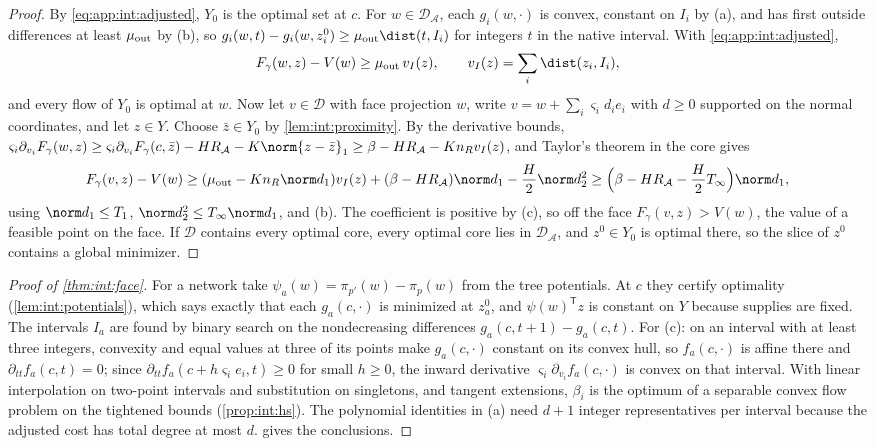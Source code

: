\begin{proof}
By \eqref{eq:app:int:adjusted}, $Y_0$ is the optimal set at $c$. For
$w\in\mathcal D_{\mathcal A}$, each $g_i(w,\cdot)$ is convex, constant on $I_i$ by (a),
and has first outside differences at least $\mu_{\rm out}$ by (b), so
$g_i(w,t)-g_i(w,z^0_i)\ge\mu_{\rm out}\dist(t,I_i)$ for integers $t$ in the native
interval. With \eqref{eq:app:int:adjusted},
\begin{equation}\label{eq:app:int:outside}
 F_\gamma(w,z)-V(w)\ge\mu_{\rm out}\,v_I(z),\qquad
 v_I(z)=\sum_i\dist(z_i,I_i),
\end{equation}
and every flow of $Y_0$ is optimal at $w$. Now let $v\in\mathcal D$ with face
projection $w$, write $v=w+\sum_i\varsigma_id_ie_i$ with $d\ge0$ supported on the normal
coordinates, and let $z\in Y$. Choose $\bar z\in Y_0$ by \cref{lem:int:proximity}. By the
derivative bounds,
$\varsigma_i\partial_{v_i}F_\gamma(w,z)\ge\varsigma_i\partial_{v_i}F_\gamma(c,\bar z)
-HR_{\mathcal A}-K\norm{z-\bar z}_1\ge\beta-HR_{\mathcal A}-Kn_Rv_I(z)$, and Taylor's
theorem in the core gives
\[
 F_\gamma(v,z)-V(w)\ge(\mu_{\rm out}-Kn_R\norm d_1)v_I(z)
 +(\beta-HR_{\mathcal A})\norm d_1-\frac H2\norm d_2^2
 \ge\Bigl(\beta-HR_{\mathcal A}-\frac H2T_\infty\Bigr)\norm d_1,
\]
using $\norm d_1\le T_1$, $\norm d_2^2\le T_\infty\norm d_1$, and (b). The coefficient
is positive by (c), so off the face $F_\gamma(v,z)>V(w)$, the value of a feasible
point on the face. If $\mathcal D$ contains every optimal core, every optimal core
lies in $\mathcal D_{\mathcal A}$, and $z^0\in Y_0$ is optimal there, so the slice of
$z^0$ contains a global minimizer.
\end{proof}

\begin{proof}[Proof of \cref{thm:int:face}]
For a network take $\psi_a(w)=\pi_{p'}(w)-\pi_p(w)$ from the tree potentials. At $c$
they certify optimality (\cref{lem:int:potentials}), which says exactly that each
$g_a(c,\cdot)$ is minimized at $z^0_a$, and $\psi(w)^{\mathsf T}z$ is constant on $Y$
because supplies are fixed. The intervals $I_a$ are found by binary search on the
nondecreasing differences $g_a(c,t+1)-g_a(c,t)$. For (c): on an interval with at
least three integers, convexity and equal values at three of its points make
$g_a(c,\cdot)$ constant on its convex hull, so $f_a(c,\cdot)$ is affine there and
$\partial_{tt}f_a(c,t)=0$; since $\partial_{tt}f_a(c+h\varsigma_ie_i,t)\ge0$ for small
$h\ge0$, the inward derivative $\varsigma_i\partial_{v_i}f_a(c,\cdot)$ is convex on that
interval. With linear interpolation on two-point intervals and substitution on
singletons, and tangent extensions, $\beta_i$ is the optimum of a separable convex
flow problem on the tightened bounds (\cref{prop:int:hs}). The polynomial identities
in (a) need $d+1$ integer representatives per interval because the adjusted cost has
total degree at most $d$.  gives the conclusions.
\end{proof}

